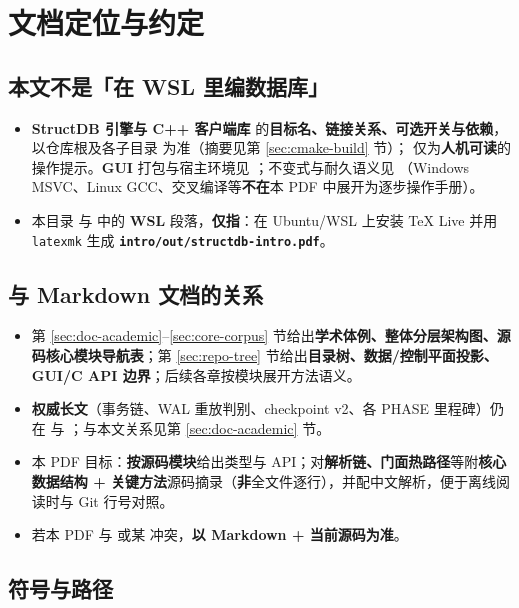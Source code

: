 \section{文档定位与约定}

\subsection{本文不是「在 WSL 里编数据库」}

\begin{itemize}
  \item \textbf{StructDB 引擎与 C++ 客户端库} 的\textbf{目标名、链接关系、可选开关与依赖}，以仓库根及各子目录  为准（摘要见第 \ref{sec:cmake-build} 节）； 仅为\textbf{人机可读}的操作提示。\textbf{GUI} 打包与宿主环境见 ；不变式与耐久语义见 （Windows MSVC、Linux GCC、交叉编译等\textbf{不在}本 PDF 中展开为逐步操作手册）。
  \item 本目录  与  中的 \textbf{WSL} 段落，\textbf{仅指}：在 Ubuntu/WSL 上安装 TeX Live 并用 \texttt{latexmk} 生成 \textbf{\texttt{intro/out/structdb-intro.pdf}}。
\end{itemize}

\subsection{与 Markdown 文档的关系}

\begin{itemize}
  \item 第 \ref{sec:doc-academic}--\ref{sec:core-corpus} 节给出\textbf{学术体例、整体分层架构图、源码核心模块导航表}；第 \ref{sec:repo-tree} 节给出\textbf{目录树、数据/控制平面投影、GUI/C API 边界}；后续各章按模块展开方法语义。
  \item \textbf{权威长文}（事务链、WAL 重放判别、checkpoint v2、各 PHASE 里程碑）仍在  与 ；与本文关系见第 \ref{sec:doc-academic} 节。
  \item 本 PDF 目标：\textbf{按源码模块}给出类型与 API；对\textbf{解析链、门面热路径}等附\textbf{核心数据结构 + 关键方法}源码摘录（\textbf{非}全文件逐行），并配中文解析，便于离线阅读时与 Git 行号对照。
  \item 若本 PDF 与  或某  冲突，\textbf{以 Markdown + 当前源码为准}。
\end{itemize}

\subsection{符号与路径}

